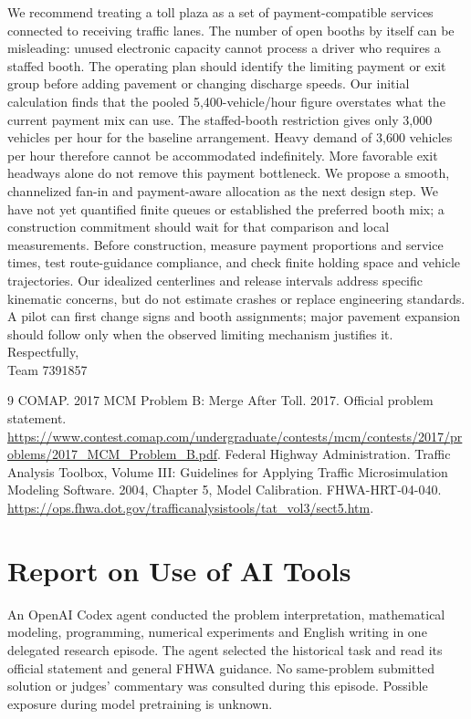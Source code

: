 \documentclass[12pt,letterpaper]{article}
\begin{document}
We recommend treating a toll plaza as a set of payment-compatible services connected to receiving traffic lanes. The number of open booths by itself can be misleading: unused electronic capacity cannot process a driver who requires a staffed booth. The operating plan should identify the limiting payment or exit group before adding pavement or changing discharge speeds.
Our initial calculation finds that the pooled 5,400-vehicle/hour figure overstates what the current payment mix can use. The staffed-booth restriction gives only 3,000 vehicles per hour for the baseline arrangement. Heavy demand of 3,600 vehicles per hour therefore cannot be accommodated indefinitely. More favorable exit headways alone do not remove this payment bottleneck.
We propose a smooth, channelized fan-in and payment-aware allocation as the next design step. We have not yet quantified finite queues or established the preferred booth mix; a construction commitment should wait for that comparison and local measurements.
Before construction, measure payment proportions and service times, test route-guidance compliance, and check finite holding space and vehicle trajectories. Our idealized centerlines and release intervals address specific kinematic concerns, but do not estimate crashes or replace engineering standards. A pilot can first change signs and booth assignments; major pavement expansion should follow only when the observed limiting mechanism justifies it.
\noindent Respectfully,\\Team 7391857
\clearpage
\begin{thebibliography}{9}
 COMAP. 2017 MCM Problem B: Merge After Toll. 2017. Official problem statement.
\url{https://www.contest.comap.com/undergraduate/contests/mcm/contests/2017/problems/2017_MCM_Problem_B.pdf}.
 Federal Highway Administration. Traffic Analysis Toolbox, Volume III: Guidelines for Applying Traffic Microsimulation Modeling Software. 2004, Chapter 5, Model Calibration. FHWA-HRT-04-040.
\url{https://ops.fhwa.dot.gov/trafficanalysistools/tat_vol3/sect5.htm}.
\end{thebibliography}
\clearpage\section*{Report on Use of AI Tools}
An OpenAI Codex agent conducted the problem interpretation, mathematical modeling, programming, numerical experiments and English writing in one delegated research episode. The agent selected the historical task and read its official statement and general FHWA guidance. No same-problem submitted solution or judges' commentary was consulted during this episode. Possible exposure during model pretraining is unknown.
\end{document}

